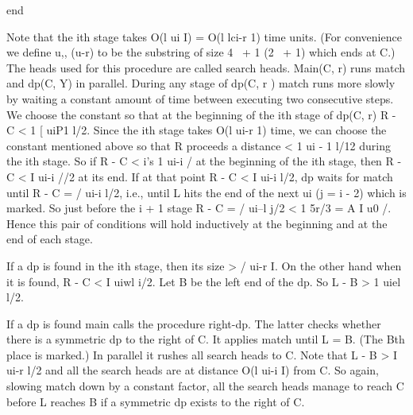 \documentclass[11pt,a4paper]{report}
\begin{document}
end

Note that the ith stage takes O(l ui I) = O(l lci-r 1) time units. (For convenience we
define u,, (u-r) to be the substring of size 4~ + 1 (2~ + 1) which ends at C.) The heads 
used for this procedure are called search heads. Main(C, r) runs match and dp(C, Y) in
parallel. During any stage of dp(C, r ) match runs more slowly by waiting a constant
amount of time between executing two consecutive steps. We choose the constant so that
at the beginning of the ith stage of dp(C, r) R - C < 1%
[ uiP1 l/2. Since the ith stage takes O(l ui-r 1) time, we can choose the constant mentioned
above so that R proceeds a distance < 1 ui - 1 l/12 during the ith stage. So if R - C <
i’s 1 ui-i / at the beginning of the ith stage, then R - C < I ui-i //2 at its end. If at that
point R - C < I ui-i l/2, dp waits for match until R - C = / ui-i l/2, i.e., until L hits
the end of the next ui (j = i - 2) which is marked. So just before the i + 1 stage
R - C = / ui--l j/2 < 1%
5r/3 = A I u0 /. Hence this pair of conditions will hold inductively at the beginning and
at the end of each stage.

If a dp is found in the ith stage, then its size > / ui-r I. On the other hand when it is
found, R - C < I uiwl i/2. Let B be the left end of the dp. So L - B > 1 uiel l/2.

If a dp is found main calls the procedure right-dp. The latter checks whether there is a
symmetric dp to the right of C. It applies match until L = B. (The Bth place is marked.)
In parallel it rushes all search heads to C. Note that L - B > I ui-r l/2 and all the search
heads are at distance O(l ui-i I) from C. So again, slowing match down by a constant
factor, all the search heads manage to reach C before L reaches B if a symmetric dp
exists to the right of C.
\end{document}
